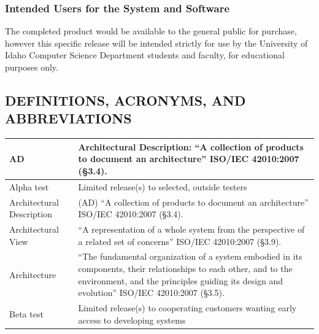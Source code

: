 \documentclass[twoside,letterpaper]{article}
\makeatletter
\newcommand\arraybslash{\let\\\@arraycr}
\makeatother
\begin{document}
{\subsubsection{Intended Users for the System and Software}
{
The completed product would be available to the general public for purchase, however this specific release will be intended strictly for use by the University of Idaho Computer Science Department students and faculty, for educational purposes only.
}


\clearpage
\subsection[DEFINITIONS, ACRONYMS, AND
ABBREVIATIONS]{\bfseries
DEFINITIONS, ACRONYMS, AND ABBREVIATIONS}

\begin{flushleft}
\tablehead{\hline
\centering \bfseries Term or
Acronym &
\centering\arraybslash \bfseries
Definition

\\\hline}
\begin{supertabular}{|m{1.3587599in}|m{5.00806in}|}
 
 AD &
 Architectural Description:
{\textquotedblleft}A collection of products to document an
architecture{\textquotedblright} ISO/IEC 42010:2007 (\S3.4).
\\\hline

 Alpha test &
 Limited release(s) to selected,
outside testers
\\\hline

 Architectural Description &
 (AD) {\textquotedblleft}A
collection of products to document an architecture{\textquotedblright}
ISO/IEC 42010:2007 (\S3.4).
\\\hline

 Architectural View &
{{\textquotedblleft}}{A
representation of a whole system from the perspective of a related set
of concerns{\textquotedblright} ISO/IEC 42010:2007 (\S3.9).}
\\\hline

 Architecture &
{{\textquotedblleft}}{The
fundamental organization of a system embodied in its components, their
relationships to each other, and to the environment, and the principles
guiding its design and evolution{\textquotedblright} ISO/IEC 42010:2007
(\S3.5).}
\\\hline

 Beta test &
 Limited release(s) to cooperating
customers wanting early access to developing systems
\\\hline


\end{supertabular}
\end{flushleft}}
\end{document}
